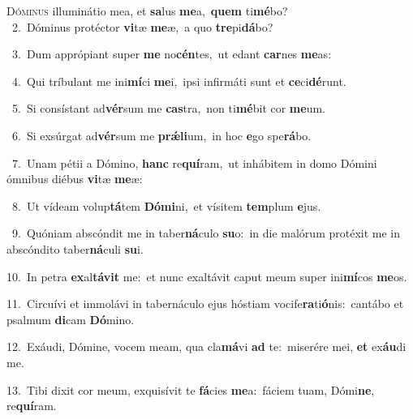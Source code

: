 \lettrine{\initial\textcolor{\initialcolor}{D}}{óminus} illuminátio mea, et \textbf{sa}\-lus \textbf{me}\-a,~\star \textbf{quem} ti\-\textbf{mé}\-bo?\\
{\numbfont\textcolor{\numbcolor}{~2.}}~Dóminus protéctor \textbf{vi}\-tæ \textbf{me}\-æ,~\star a quo \textbf{tre}\-pi\-\textbf{dá}\-bo?\par
{\numbfont\textcolor{\numbcolor}{~3.}}~Dum apprópiant super \textbf{me} no\-\textbf{cén}\-tes,~\star ut edant \textbf{car}\-nes \textbf{me}\-as:\par
{\numbfont\textcolor{\numbcolor}{~4.}}~Qui tríbulant me ini\-\textbf{mí}\-ci \textbf{me}\-i,~\star ipsi infirmáti sunt et \textbf{ce}\-ci\-\textbf{dé}\-runt.\par
{\numbfont\textcolor{\numbcolor}{~5.}}~Si consístant ad\-\textbf{vér}\-sum me \textbf{cas}\-tra,~\star non ti\-\textbf{mé}\-bit cor \textbf{me}\-um.\par
{\numbfont\textcolor{\numbcolor}{~6.}}~Si exsúrgat ad\-\textbf{vér}\-sum me \textbf{prǽ}\-\textbf{li}um,~\star in hoc \textbf{e}\-go spe\-\textbf{rá}\-bo.\par
{\numbfont\textcolor{\numbcolor}{~7.}}~Unam pétii a Dómino, \textbf{hanc} re\-\textbf{quí}\-ram,~\star ut inhábitem in domo Dómini ómnibus diébus \textbf{vi}\-tæ \textbf{me}\-æ:\par
{\numbfont\textcolor{\numbcolor}{~8.}}~Ut vídeam volup\-\textbf{tá}\-tem \textbf{Dó}\-\textbf{mi}ni,~\star et vísitem \textbf{tem}\-plum \textbf{e}\-jus.\par
{\numbfont\textcolor{\numbcolor}{~9.}}~Quóniam abscóndit me in taber\-\textbf{ná}\-culo \textbf{su}\-o:~\star in die malórum protéxit me in abscóndito taber\-\textbf{ná}\-culi \textbf{su}\-i.\par
{\numbfont\textcolor{\numbcolor}{10.}}~In petra \textbf{ex}\-al\-\textbf{tá}\-\textbf{vit} me:~\star et nunc exaltávit caput meum super ini\-\textbf{mí}\-cos \textbf{me}\-os.\par
{\numbfont\textcolor{\numbcolor}{11.}}~Circuívi et immolávi in tabernáculo ejus hóstiam vocife\-\textbf{ra}\-ti\-\textbf{ó}\-nis:~\star cantábo et psalmum \textbf{di}\-cam \textbf{Dó}\-mino.\par
{\numbfont\textcolor{\numbcolor}{12.}}~Exáudi, Dómine, vocem meam, qua cla\-\textbf{má}\-vi \textbf{ad} te:~\star miserére mei, \textbf{et} ex\-\textbf{áu}\-di me.\par
{\numbfont\textcolor{\numbcolor}{13.}}~Tibi dixit cor meum, exquisívit te \textbf{fá}\-cies \textbf{me}\-a:~\star fáciem tuam, Dómi\-\textbf{ne}\-, re\-\textbf{quí}\-ram.\par
